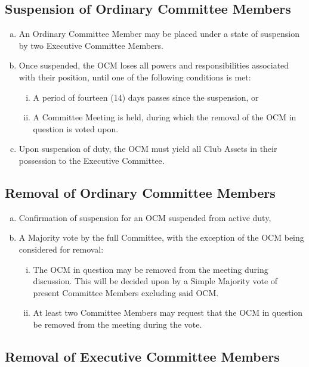 \documentclass[a4paper,12pt]{article}
\begin{document}
\subsection{Suspension of Ordinary Committee Members}

\begin{enumerate}[a)]
	\item An Ordinary Committee Member may be placed under a state of suspension by two Executive Committee Members.
	\item Once suspended, the OCM loses all powers and responsibilities associated with their position, until one of the following conditions is met:
	\begin{enumerate}[i)]
		\item A period of fourteen (14) days passes since the suspension, or
		\item A Committee Meeting is held, during which the removal of the OCM in question is voted upon.
	\end{enumerate}
	\item Upon suspension of duty, the OCM must yield all Club Assets in their possession to the Executive Committee.
\end{enumerate}

\subsection{Removal of Ordinary Committee Members}

\begin{enumerate}[a)]
	\item Confirmation of suspension for an OCM suspended from active duty,
	\item A Majority vote by the full Committee, with the exception of the OCM being considered for removal:
	\begin{enumerate}[i)]
		\item The OCM in question may be removed from the meeting during discussion. This will be decided upon by a Simple Majority vote of present Committee Members excluding said OCM.
		\item At least two Committee Members may request that the OCM in question be removed from the meeting during the vote.
	\end{enumerate}
\end{enumerate}

\subsection{Removal of Executive Committee Members}
\end{document}
